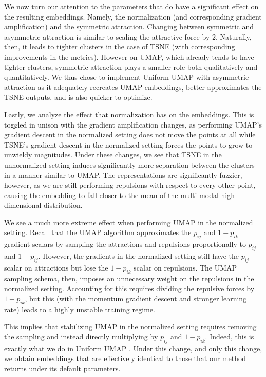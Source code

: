 \documentclass[sigconf, nonacm]{acmart}
\newcommand\ourmethod{Uniform UMAP }
\begin{document}
We now turn our attention to the parameters that do have a significant effect on the resulting embeddings. Namely, the normalization (and
corresponding gradient amplification) and the symmetric attraction. Changing between symmetric and asymmetric attraction is similar to scaling
the attractive force by 2. Naturally, then, it leads to tighter clusters in the case of TSNE (with corresponding improvements in the metrics). However on UMAP, which
already tends to have tighter clusters, symmetric attraction plays a smaller role both qualitatively and quantitatively. We thus chose to implement
\ourmethod with asymmetric attraction as it adequately recreates UMAP embeddings, better approximates the TSNE outputs, and is also quicker to optimize.

Lastly, we analyze the effect that normalization has on the embeddings. This is toggled in unison with the gradient amplification changes, as performing UMAP's
gradient descent in the normalized setting does not move the points at all while TSNE's gradient descent in the normalized setting forces the points to grow
to unwieldy magnitudes. Under these changes, we see that TSNE in the unnormalized setting induces significantly more separation between the clusters in a manner
similar to UMAP. The representations are significantly fuzzier, however, as we are still performing repulsions with respect to every other point, causing the
embedding to fall closer to the mean of the multi-modal high dimensional distribution.

We see a much more extreme effect when performing UMAP in the normalized setting. Recall that the UMAP algorithm approximates the $p_{ij}$ and $1 - p_{ik}$
gradient scalars by sampling the attractions and repulsions proportionally to $p_{ij}$ and $1 - p_{ij}$. However, the gradients in the normalized setting still
have the $p_{ij}$ scalar on attractions but lose the $1 - p_{ik}$ scalar on repulsions. The UMAP sampling schema, then, imposes an unnecessary weight on the
repulsions in the normalized setting.
Accounting for this requires dividing the repulsive forces by $1 - p_{ik}$, but this (with the momentum gradient descent and stronger learning rate) leads to
a highly unstable training regime.

This implies that stabilizing UMAP in the normalized setting requires removing the sampling and instead directly multiplying by $p_{ij}$ and $1 - p_{ik}$.
Indeed, this is exactly what we do in \ourmethod.
Under this change, and only this change, we obtain embeddings that are effectively identical to those that our method returns under its default parameters.
\end{document}

